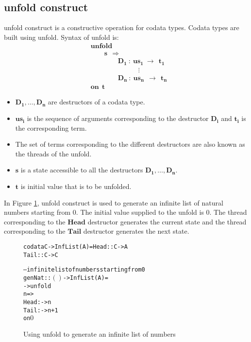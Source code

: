 \documentclass[11pt]{article}
\begin{document}
\subsection {unfold construct}
{\sf unfold} construct is a constructive operation for codata types. Codata types are built using {\sf unfold}. Syntax of {\sf unfold} is:
\begin{align*} 
&\mathbf{unfold}\\
&\qquad\mathbf{s~~\Rightarrow}  \\
&\qquad\qquad\mathbf{D_1~:~us_1~\to~~t_1} \\
&\qquad\qquad\mathbf{\qquad\quad \vdots} \\
&\qquad\qquad\mathbf{D_n~:~us_n~~\to~~t_n}\\
&\mathbf{on~~t}
\end{align*}
\begin{itemize}
  \item $\mathbf{D_1,\ldots,D_n}$ are destructors of a codata type.
  \item $\mathbf{us_i}$ is the sequence of arguments corresponding to the destructor $\mathbf{D_i}$ and $\mathbf{t_i}$ is the corresponding term.
  \item The set of terms corresponding to the different destructors are also known as the threads of the {\sf unfold}.
  \item $\mathbf{s}$ is a state accessible to all the destructors $\mathbf{D_1,\ldots,D_n}$.
  \item $\mathbf{t}$ is initial value that is to be unfolded.
\end{itemize}
In Figure \ref{seqMPL:unfoldExample}, {\sf unfold} construct is used to generate an infinite list of natural numbers starting from 0. The initial value supplied to the unfold is 0. The thread corresponding to the $\mathbf{Head}$ destructor generates the current state and the thread corresponding to the $\mathbf{Tail}$ destructor generates the next state. 
\begin{figure}[!h]
\begin{alltt}
                codata C -> InfList(A) = Head :: C -> A  
                                         Tail :: C -> C  


                -- infinite list of numbers starting from 0
                genNat :: \(()\) -> InfList(A) =
                   -> unfold
                        n => 
                          Head : -> n
                          Tail : -> n + 1
                      on \(0\)    
\end{alltt} 
\caption{Using unfold to generate an infinite list of numbers}
\label{seqMPL:unfoldExample}
\end{figure}
\end{document}
